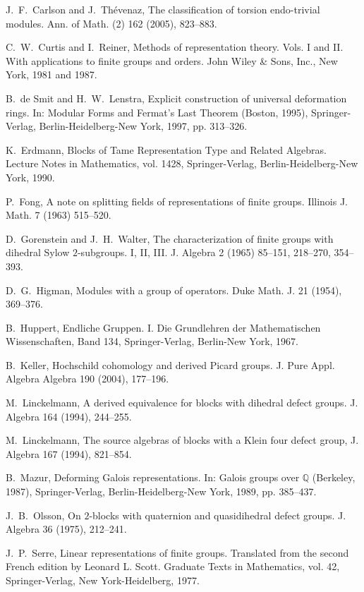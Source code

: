 \documentclass{amsart}
\theoremstyle{plain}
\theoremstyle{definition}
\theoremstyle{remark}
\begin{document}
\begin{thebibliography}{88}
 J.~F.~Carlson and J.~Th\'{e}venaz, The classification of torsion endo-trivial modules.  
Ann. of Math. (2)  162  (2005),  823--883.

 C.~W.~Curtis and I.~Reiner,  Methods of representation theory. Vols. I and II. With applications to finite groups and orders. John Wiley \& Sons, Inc., New York, 1981 and 1987. 

 B.~de Smit and H.~W.~Lenstra, Explicit construction of universal deformation rings. In: Modular Forms and Fermat's Last Theorem (Boston,  1995), Springer-Verlag, Berlin-Heidelberg-New York, 1997, pp. 313--326.

 K.~Erdmann, Blocks of Tame Representation Type and Related Algebras. Lecture Notes in Mathematics, vol. 1428, Springer-Verlag, Berlin-Heidelberg-New York, 1990.

 P.~Fong, A note on splitting fields of representations of finite groups.  
Illinois J. Math.  7  (1963) 515--520.

 D.~Gorenstein and J.~H.~Walter, The characterization of finite groups with dihedral Sylow $2$-subgroups. I, II, III. J. Algebra 2 (1965) 85--151, 218--270, 354--393.

 D.~G.~Higman, Modules with a group of operators. Duke Math. J. 21 (1954), 
369--376.

 B.~Huppert, Endliche Gruppen. I. Die Grundlehren der Mathematischen Wissenschaften, Band 134, Springer-Verlag, Berlin-New York, 1967.

 B.~Keller, Hochschild cohomology and derived Picard groups. J. Pure Appl. Algebra
Algebra  190  (2004), 177--196.

 M.~Linckelmann, A derived equivalence for blocks with dihedral defect groups. J. 
Algebra 164 (1994), 244--255.

 M.~Linckelmann, The source algebras of blocks with a Klein four defect group, J.
Algebra 167 (1994), 821--854.

       
 B.~Mazur, Deforming Galois representations. In: Galois groups over $\mathbb{Q}$ (Berkeley,  1987), Springer-Verlag, Berlin-Heidelberg-New York, 1989, pp. 385--437.
        
 J.~B.~Olsson, On $2$-blocks with quaternion and quasidihedral defect groups.
J. Algebra 36 (1975), 212--241.        

 J.~P.~Serre, Linear representations of finite groups. Translated from the second French edition by Leonard L. Scott. Graduate Texts in Mathematics, vol. 42, Springer-Verlag, New York-Heidelberg, 1977.

\end{thebibliography}
\end{document}
